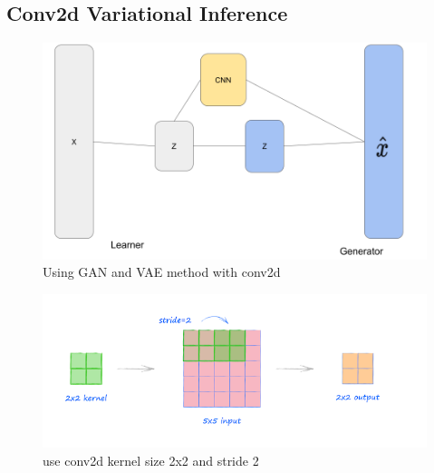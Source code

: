 \documentclass[12pt]{article}
\begin{document}
\subsection{Conv2d Variational Inference}
\begin{figure}[H]
    \centering
    \includegraphics[width=0.5\linewidth]{../fig/GANandVAE.png} %
    \caption{Using GAN and VAE method with conv2d }
    \label{fig:GANandVAE}
\end{figure}


\begin{figure}[H]
    \centering
    \includegraphics[width=0.5\linewidth]{../fig/2x2kernelstrike2.png} %
    \caption{use conv2d kernel size 2x2 and stride 2}
    \label{fig:conv2d}
\end{figure}
\end{document}
